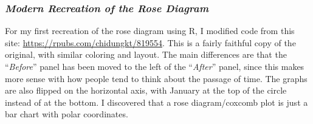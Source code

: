 \documentclass[
  dvipsnames]{article}
\begin{document}
\newpage

\hypertarget{modern-recreation-of-the-rose-diagram}{%
\subsubsection{\texorpdfstring{\emph{Modern Recreation of the Rose
Diagram}}{Modern Recreation of the Rose Diagram}}\label{modern-recreation-of-the-rose-diagram}}

For my first recreation of the rose diagram using R, I modified code
from this site: \url{https://rpubs.com/chidungkt/819554}. This is a
fairly faithful copy of the original, with similar coloring and layout.
The main differences are that the ``\emph{Before}'' panel has been moved
to the left of the ``\emph{After}'' panel, since this makes more sense
with how people tend to think about the passage of time. The graphs are
also flipped on the horizontal axis, with January at the top of the
circle instead of at the bottom. I discovered that a rose
diagram/coxcomb plot is just a bar chart with polar coordinates.
\end{document}

